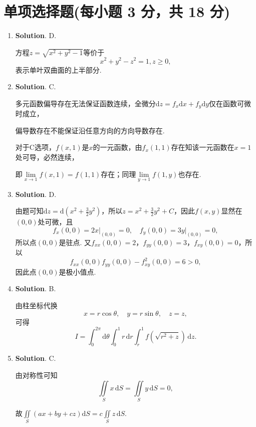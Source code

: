 \documentclass[../main.tex]{subfiles}
\begin{document}
\section{单项选择题(每小题 3 分，共 18 分)}
\begin{enumerate}
  \item \textbf{Solution}. D.

        方程$z=\sqrt{x^2+y^2-1}$等价于
        \[
          x^2+y^2-z^2=1,z\geq0,
        \]
        表示单叶双曲面的上半部分.

  \item \textbf{Solution}. C.

        多元函数偏导存在无法保证函数连续，全微分$\mathrm{d}z=f_x\mathrm{d}x+f_y\mathrm{d}y$仅在函数可微时成立，

        偏导数存在不能保证沿任意方向的方向导数存在.

        对于C选项，$f(x,1)$是$x$的一元函数，由$f_x(1,1)$存在知该一元函数在$x=1$处可导，必然连续，

        即$\lim\limits_{x\to1}f(x,1)=f(1,1)$存在；同理$\lim\limits_{y\to1}f(1,y)$也存在.

  \item \textbf{Solution}. D.

        由题可知$\mathrm{d}z=\mathrm{d}\left(x^2+\frac{3}{2}y^2\right)$，所以$z=x^2+\frac{3}{2}y^2+C$，因此$f(x,y)$显然在$(0,0)$处可微，且
        \[
          f_{x}(0,0)=2x\big|_{(0,0)}=0,\quad f_{y}(0,0)=3y\big|_{(0,0)}=0,
        \]
        所以点$(0,0)$是驻点. 又$f_{xx}(0,0)=2$，$f_{yy}(0,0)=3$，$f_{xy}(0,0)=0$，所以
        \[
          f_{xx}(0,0)f_{yy}(0,0)-f_{xy}^2(0,0)=6>0,
        \]
        因此点$(0,0)$是极小值点.

  \item \textbf{Solution}. B.

        由柱坐标代换
        \[
          x=r\cos\theta,\quad y=r\sin\theta,\quad z=z,
        \]
        可得
        \[
          I=\int_0^{2\pi}\mathrm{d}\theta\int_0^1 r\,\mathrm{d}r\int_r^1 f(\sqrt{r^2+z})\,\mathrm{d}z.
        \]

  \item \textbf{Solution}. C.

        由对称性可知
        \[
          \iint\limits_{S} x\,\mathrm{d}S=\iint\limits_{S} y\,\mathrm{d}S=0,
        \]

        故$\iint\limits_{S} (ax + by + cz) \mathrm{d}S = c \iint\limits_{S} z\,\mathrm{d}S$.


\end{enumerate}
\end{document}
